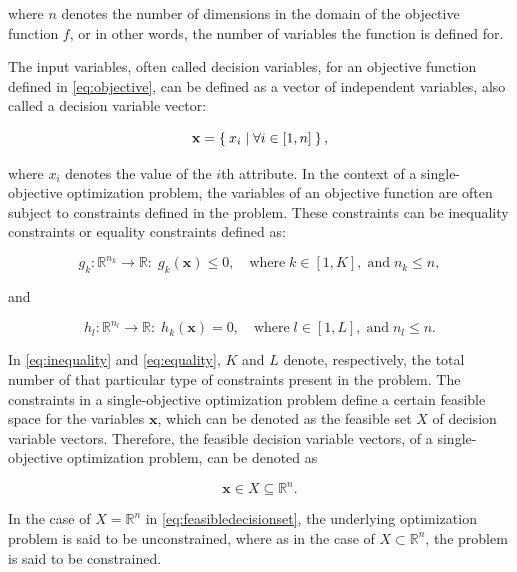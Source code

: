 where $n$ denotes the number of dimensions in the domain of the objective function $f$, or in
other words, the number of variables the function is defined for.

The input variables, often called decision variables, for an objective function defined in \eqref{eq:objective},
can be defined as a vector
of independent variables, also called a decision variable vector:

\begin{equation}
    \label{eq:variablevector}
    \mathbf{x} = \Set{x_i \mid \forall i \in \left[1, n\right]},
\end{equation}

where $x_i$ denotes the value of the $i$th attribute. In the context of a single-objective optimization problem,
the variables of an objective function are often subject to constraints defined in the problem.
These constraints can be 
inequality constraints or equality constraints defined as:

\begin{equation}
    \label{eq:inequality}
    g_k: \mathbb{R}^{n_k} \to \mathbb{R}:\; g_k(\mathbf{x}) \leq 0,\quad\text{where}\;k\in\left[1, K\right],\;\text{and}\;n_k\leq n,
\end{equation}

and

\begin{equation}
    \label{eq:equality}
    h_l: \mathbb{R}^{n_l}\to\mathbb{R}:\;h_k(\mathbf{x}) = 0,\quad\text{where}\;l\in\left[1, L\right],\;\text{and}\;n_l\leq n.
\end{equation}

In \eqref{eq:inequality} and \eqref{eq:equality}, $K$ and $L$ denote, respectively,
the total number of that particular type of constraints present in the problem. The constraints in a single-objective
optimization problem define a certain feasible space for the variables $\mathbf{x}$, which can be denoted
as the feasible set $X$ of decision variable vectors. Therefore, the feasible decision variable vectors, of a single-objective
optimization problem, can be
denoted as

\begin{equation}
    \label{eq:feasibledecisionset}
    \mathbf{x} \in X \subseteq \mathbb{R}^n.
\end{equation}

In the case of $X=\mathbb{R}^n$ in \eqref{eq:feasibledecisionset}, the underlying optimization problem is said to be
unconstrained, where as in the case of $X\subset\mathbb{R}^n$, the problem is said to be constrained.

